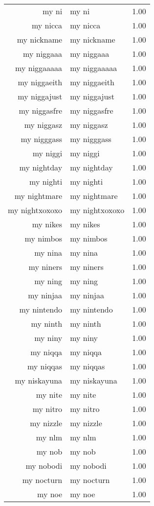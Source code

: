 \begin{table}[ht]
\begin{tabular}{rlr}
  my ni & my ni & 1.00 \\ 
  my nicca & my nicca & 1.00 \\ 
  my nickname & my nickname & 1.00 \\ 
  my niggaaa & my niggaaa & 1.00 \\ 
  my niggaaaaa & my niggaaaaa & 1.00 \\ 
  my niggaeith & my niggaeith & 1.00 \\ 
  my niggajust & my niggajust & 1.00 \\ 
  my niggasfre & my niggasfre & 1.00 \\ 
  my niggasz & my niggasz & 1.00 \\ 
  my nigggass & my nigggass & 1.00 \\ 
  my niggi & my niggi & 1.00 \\ 
  my nightday & my nightday & 1.00 \\ 
  my nighti & my nighti & 1.00 \\ 
  my nightmare & my nightmare & 1.00 \\ 
  my nightxoxoxo & my nightxoxoxo & 1.00 \\ 
  my nikes & my nikes & 1.00 \\ 
  my nimbos & my nimbos & 1.00 \\ 
  my nina & my nina & 1.00 \\ 
  my niners & my niners & 1.00 \\ 
  my ning & my ning & 1.00 \\ 
  my ninjaa & my ninjaa & 1.00 \\ 
  my nintendo & my nintendo & 1.00 \\ 
  my ninth & my ninth & 1.00 \\ 
  my niny & my niny & 1.00 \\ 
  my niqqa & my niqqa & 1.00 \\ 
  my niqqas & my niqqas & 1.00 \\ 
  my niskayuna & my niskayuna & 1.00 \\ 
  my nite & my nite & 1.00 \\ 
  my nitro & my nitro & 1.00 \\ 
  my nizzle & my nizzle & 1.00 \\ 
  my nlm & my nlm & 1.00 \\ 
  my nob & my nob & 1.00 \\ 
  my nobodi & my nobodi & 1.00 \\ 
  my nocturn & my nocturn & 1.00 \\ 
  my noe & my noe & 1.00 \\ 

\end{tabular}
\end{table}
